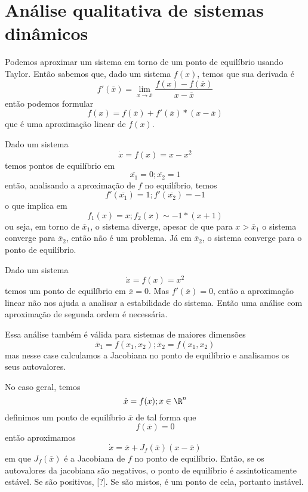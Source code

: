 
\section*{Análise qualitativa de sistemas dinâmicos}


Podemos aproximar um sistema em torno de um ponto de equilíbrio usando Taylor. Então sabemos que, dado um sistema $f(x)$, temos que sua derivada é \[
    f'(\overline{x}) = \lim_{x \to \overline{x}} \frac{f(x) - f(\overline{x})}{x-\overline{x}}
\] então podemos formular \[
f(x) = f(\overline{x}) + f'(\overline{x}) * (x - \overline{x})
\] que é uma aproximação linear de $f(x)$.

\begin{note}
    Dado um sistema \[
	\dot{x} = f(x) = x - x^{2}
    \] temos pontos de equilíbrio em \[
    \overline{x_1} = 0 ; \overline{x_2} = 1 
    \] então, analisando a aproximação de $f$ no equilíbrio, temos \[
    f'(\overline{x_1}) = 1 ; f'(\overline{x_2}) = -1
    \] o que implica em \[
    f_1(x) = x ; f_2(x) \sim -1*(x+1)
    \] ou seja, em torno de $\overline{x}_1$, o sistema diverge, apesar de que para $x>\overline{x}_1$ o sistema converge para $\overline{x}_2$, então não é um problema. Já em $\overline{x}_2$, o sistema converge para o ponto de equilíbrio.
\end{note}

\begin{note}
    Dado um sistema \[
	\dot{x} = f(x) = x^{2}
    \] temos um ponto de equilíbrio em $\overline{x}=0$. Mas $f'(\overline{x}) = 0$, então a aproximação linear não nos ajuda a analisar a estabilidade do sistema. Então uma análise com aproximação de segunda ordem é necessária.
\end{note}

Essa análise também é válida para sistemas de maiores dimensões \[
    \overline{x}_1 = f(x_1,x_2) ; \overline{x}_2 = f(x_1,x_2)
\] mas nesse case calculamos a Jacobiana no ponto de equilíbrio e analisamos os seus autovalores.

No caso geral, temos \[
    \dot{x} = f(x) ; x\in \R^{n}
\] definimos um ponto de equilíbrio $\overline{x}$ de tal forma que \[
f(\overline{x}) = 0
\] então aproximamos \[
\dot{x} = \overline{x} + J_f(\overline{x})(x-\overline{x})
\] em que $ J_f (\overline{x})$ é a Jacobiana de $f$ no ponto de equilíbrio. Então, se os autovalores da jacobiana são negativos, o ponto de equilíbrio é assintoticamente estável. Se são positivos, [?]. Se são mistos, é um ponto de cela, portanto instável.

